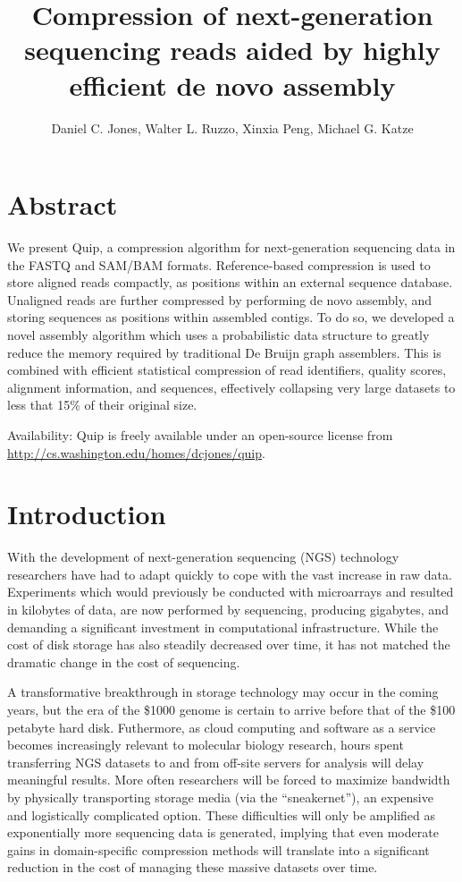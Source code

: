 \documentclass[twocolumn]{article}
\title{Compression of next-generation sequencing reads aided by highly efficient de novo assembly}
\author{Daniel C. Jones, Walter L. Ruzzo, Xinxia Peng, Michael G. Katze}
\begin{document}
\maketitle

\section{Abstract}

We present Quip, a compression algorithm for next-generation sequencing data
in the FASTQ and SAM/BAM formats. Reference-based compression is used to store
aligned reads compactly, as positions within an external sequence database.
Unaligned reads are further compressed by performing de novo assembly, and
storing sequences as positions within assembled contigs. To do so, we
developed a novel assembly algorithm which uses a probabilistic data structure
to greatly reduce the memory required by traditional De Bruijn graph
assemblers. This is combined with efficient statistical compression of read
identifiers, quality scores, alignment information, and sequences, effectively
collapsing very large datasets to less that 15\% of their original size.

Availability: Quip is freely available under an open-source license from
\url{http://cs.washington.edu/homes/dcjones/quip}.

\section{Introduction}

With the development of next-generation sequencing (NGS) technology
researchers have had to adapt quickly to cope with the vast increase in raw
data. Experiments which would previously be conducted with microarrays and
resulted in kilobytes of data, are now performed by sequencing, producing
gigabytes, and demanding a significant investment in computational
infrastructure. While the cost of disk storage has also steadily decreased
over time, it has not matched the dramatic change in the cost of sequencing.

A transformative breakthrough in storage technology may occur in the coming
years, but the era of the \$1000 genome is certain to arrive before that of
the \$100 petabyte hard disk. Futhermore, as cloud computing and software as a
service becomes increasingly relevant to molecular biology research, hours
spent transferring NGS datasets to and from off-site servers for analysis will
delay meaningful results. More often researchers will be forced to maximize
bandwidth by physically transporting storage media (via the ``sneakernet''),
an expensive and logistically complicated option. These difficulties will only
be amplified as exponentially more sequencing data is generated,  implying
that even moderate gains in domain-specific compression methods will translate
into a significant reduction in the cost of managing these massive
datasets over time.
\end{document}
